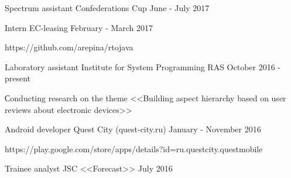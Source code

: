 



\begin{cventries}
	
	\cventrynodescription
	{Spectrum assistant} %
	{Confederations Cup} %
	{} %
	{June - July 2017} %


\cventry
{Intern} %
{EC-leasing} %
{} %
{February - March 2017} %
{ 
	\begin{cvitems}
		\item {https://github.com/arepina/rtojava}
	\end{cvitems}
}



\cventry
{Laboratory assistant} %
{Institute for System Programming RAS} %
{} %
{October 2016 - present} %
{ 
	\begin{cvitems}
		\item {Сonducting research on the theme <<Building aspect hierarchy based on user reviews about electronic devices>>}
	\end{cvitems}
}


\cventry
{Android developer} %
{Quest City (quest-city.ru)} %
{} %
{January - November 2016} %
{ %
  \begin{cvitems}
\item {https://play.google.com/store/apps/details?id=ru.questcity.questmobile}
 \end{cvitems}
}


\cventrynodescription
{Trainee analyst } %
{JSC <<Forecast>>} %
{} %
{July 2016} %



\end{cventries}
